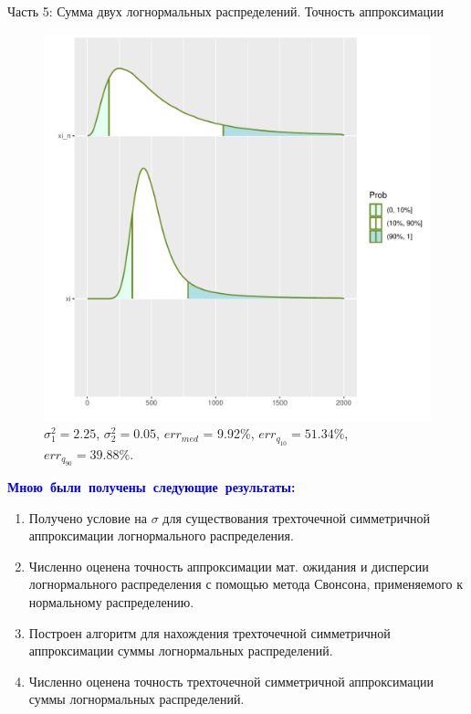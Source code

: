 \documentclass[ucs, notheorems, handout]{beamer}
\begin{document}
\begin{frame}{Часть 5: Сумма двух логнормальных распределений. Точность аппроксимации }
		
	\begin{figure}[h]
		\begin{center}
			\begin{minipage}[h]{0.53\linewidth}
				\includegraphics[width=1\linewidth]{img/par_1.pdf}
				\caption{$\sigma_{1}^{2} = 2.25$, $\sigma_{2}^{2} = 0.05$, $err_{med}$ = 9.92\%,  $err_{q_{10}} = 51.34\%$,  $err_{q_{90}} = 39.88\%$. } %
				\label{ris7} %
			\end{minipage}
			
		\end{center}
	\end{figure}
\end{frame}
	
\begin{frame}{}
	
	
	\textcolor{blue}{\hbox{\textbf{Мною были получены следующие результаты:}}}
	\begin{enumerate}
		\item Получено условие на $\sigma$ для существования трехточечной симметричной аппроксимации логнормального распределения.
		\item Численно оценена точность аппроксимации мат. ожидания и дисперсии логнормального распределения с помощью метода Свонсона, применяемого к нормальному распределению.
		\item Построен алгоритм для нахождения трехточечной симметричной аппроксимации суммы логнормальных распределений.
		\item Численно оценена точность трехточечной симметричной аппроксимации суммы логнормальных распределений.
	\end{enumerate}
	
\end{frame}


	
	
\end{document}

